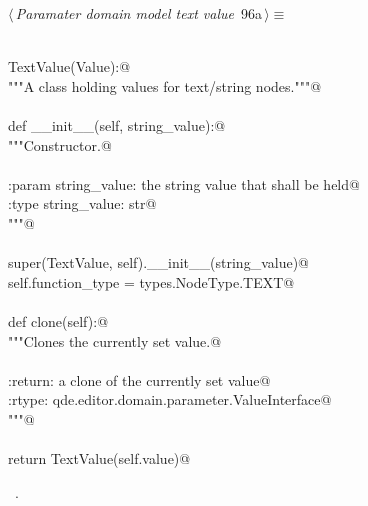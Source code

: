 \documentclass[
    a4paper,      %
    10pt,         %
    openright,    %
    notitlepage,  %
    parskip=half, %
]{scrreprt}       %
\theoremstyle{definition}                    %
\begin{document}
\begin{flushleft} \small
\begin{minipage}{\linewidth}\label{scrap153}\raggedright\small
{} $\langle\,${\itshape Paramater domain model text value}\nobreak\ {\footnotesize {96a}}$\,\rangle\equiv$
\vspace{-1exm}
\begin{list}{}{} \item
\mbox{}\lstinline@@\\
\mbox{}\lstinline@class TextValue(Value):@\\
\mbox{}\lstinline@    """A class holding values for text/string nodes."""@\\
\mbox{}\lstinline@@\\
\mbox{}\lstinline@    def __init__(self, string_value):@\\
\mbox{}\lstinline@        """Constructor.@\\
\mbox{}\lstinline@@\\
\mbox{}\lstinline@        :param string_value: the string value that shall be held@\\
\mbox{}\lstinline@        :type  string_value: str@\\
\mbox{}\lstinline@        """@\\
\mbox{}\lstinline@@\\
\mbox{}\lstinline@        super(TextValue, self).__init__(string_value)@\\
\mbox{}\lstinline@        self.function_type = types.NodeType.TEXT@\\
\mbox{}\lstinline@@\\
\mbox{}\lstinline@    def clone(self):@\\
\mbox{}\lstinline@        """Clones the currently set value.@\\
\mbox{}\lstinline@@\\
\mbox{}\lstinline@        :return: a clone of the currently set value@\\
\mbox{}\lstinline@        :rtype:  qde.editor.domain.parameter.ValueInterface@\\
\mbox{}\lstinline@        """@\\
\mbox{}\lstinline@@\\
\mbox{}\lstinline@        return TextValue(self.value)@{\NWsep}
\end{list}
\vspace{-1.5ex}
\footnotesize
\begin{list}{}{\setlength{\itemsep}{-\parsep}\setlength{\itemindent}{-\leftmargin}}
\item \NWtxtMacroRefIn\ .

\item{}
\end{list}
\end{minipage}\vspace{4ex}
\end{flushleft}
\end{document}
